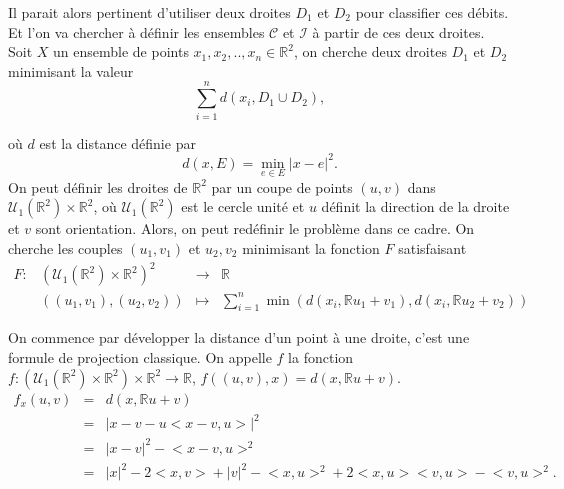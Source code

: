 \documentclass[a4paper,10pt]{article}
\begin{document}
Il parait alors pertinent d'utiliser deux droites $D_1$ et $D_2$ pour classifier ces débits. Et l'on va chercher à définir les ensembles $\mathcal{C}$ et $\mathcal{I}$ à partir de ces deux droites.
Soit $X$ un ensemble de points  $x_1, x_2, .., x_n \in \mathbb{R}^2$, on cherche deux droites $D_1$ et $D_2$ minimisant la valeur
\[\sum_{i=1}^{n}d(x_i, D_1 \cup D_2),\]

où $d$ est la distance définie par 
\[d(x,E)= \min_{e \in E} |x-e|^2.\]
On peut définir les droites de $\mathbb{R}^2$ par un coupe de points $(u,v)$ dans $\mathcal{U}_1(\mathbb{R}^2)\times\mathbb{R}^2$, où $\mathcal{U}_1(\mathbb{R}^2)$ est le cercle unité et $u$ définit la direction de la droite et $v$ sont orientation. Alors, on peut redéfinir le problème dans ce cadre. On cherche les couples $(u_1,v_1)$ et $u_2,v_2$ minimisant la fonction $F$ satisfaisant 
\begin{equation}
	\label{F}
	\begin{array}{cccc}
		F: & (\mathcal{U}_1(\mathbb{R}^2)\times\mathbb{R}^2)^2 &\to &\mathbb{R}\\
		& ((u_1,v_1), (u_2,v_2)) & \mapsto & \sum_{i=1}^{n}\min (d(x_i,\mathbb{R}u_1+v_1), d(x_i,\mathbb{R}u_2+v_2))
	\end{array}
\end{equation}


On commence par développer la distance d'un point à une droite, c'est une formule de projection classique. On appelle $f$ la fonction $f:(\mathcal{U}_1(\mathbb{R}^2)\times\mathbb{R}^2) \times \mathbb{R}^2 \to \mathbb{R}$, $f((u,v),x)=d(x,\mathbb{R}u+v)$.
\begin{equation}
	\begin{array}{ccc}
		f_x(u,v)&=&d(x,\mathbb{R}u+v)\\
		&=& \big|x-v-u\big<x-v , u\big> \big|^2\\
		&=& \big|x-v\big|^2 -\big<x-v, u\big>^2\\
		&=& \big|x\big|^2-2\big<x,v\big>+\big|v\big|^2 -\big<x, u\big>^2+ 2\big<x, u\big>\big<v, u\big>- \big<v, u\big>^2.
	\end{array}
\end{equation}
\end{document}
